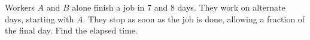 Workers $A$ and $B$ alone finish a job in 7 and 8 days. They work on alternate days, starting with $A$. They stop as soon as the job is done, allowing a fraction of the final day. Find the elapsed time.
